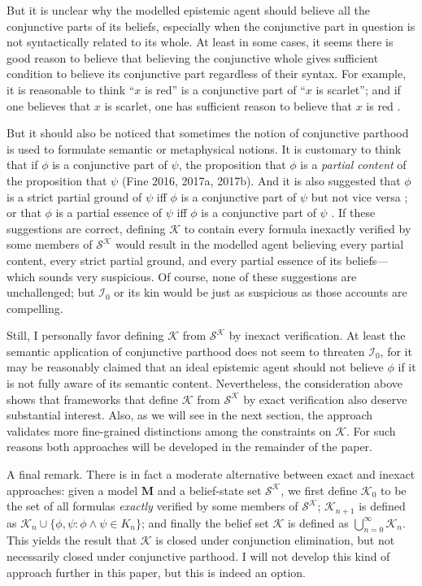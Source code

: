\documentclass[12pt]{article}
\newcommand{\K}{\mathcal{K}}
\newcommand{\SK}{\mathcal{S}^\mathcal{K}}
\begin{document}
\par
But it is unclear why the modelled epistemic agent should believe all the conjunctive parts of its beliefs, especially when the conjunctive part in question is not syntactically related to its whole. At least in some cases, it seems there is good reason to believe that believing the conjunctive whole gives sufficient condition to believe its conjunctive part regardless of their syntax. For example, it is reasonable to think ``$x$ is red'' is a conjunctive part of ``$x$ is scarlet''; and if one believes that $x$ is scarlet, one has sufficient reason to believe that $x$ is red \cite{Jago2024-JAGBIT}. 
\par
But it should also be noticed that sometimes the notion of conjunctive parthood is used to formulate semantic or metaphysical notions. It is customary to think that if $\phi$ is a conjunctive part of $\psi$, the proposition that $\phi$ is a \textit{partial content} of the proposition that $\psi$ (Fine 2016, 2017a, 2017b). And it is also suggested that $\phi$ is a strict partial ground of $\psi$ iff $\phi$ is a conjunctive part of $\psi$ but not vice versa \cite{Fine2012-FINTPL-2}; or that $\phi$ is a partial essence of $\psi$ iff $\phi$ is a conjunctive part of $\psi$ \cite{Correia2017-CORGEA}. If these suggestions are correct, defining $\K$ to contain every formula inexactly verified by some members of $\SK$ would result in the modelled agent believing every partial content, every strict partial ground, and every partial essence of its beliefs---which sounds very suspicious. Of course, none of these suggestions are unchallenged; but $\mathcal{I}_0$ or its kin would be just as suspicious as those accounts are compelling. 
\par
Still, I personally favor defining $\K$ from $\SK$ by inexact verification. At least the semantic application of conjunctive parthood does not seem to threaten $\mathcal{I}_0$, for it may be reasonably claimed that an ideal epistemic agent should not believe $\phi$ if it is not fully aware of its semantic content. Nevertheless, the consideration above shows that frameworks that define $\K$ from $\SK$ by exact verification also deserve substantial interest. Also, as we will see in the next section, the approach validates more fine-grained distinctions among the constraints on $\K$. For such reasons both approaches will be developed in the remainder of the paper.
\par
A final remark. There is in fact a moderate alternative between exact and inexact approaches: given a model $\bm{M}$ and a belief-state set $\SK$, we first define $\K_0$ to be the set of all formulas \textit{exactly} verified by some members of $\SK$; $\K_{n + 1}$ is defined as $\K_n \cup \{\phi, \psi: \phi \land \psi \in K_n\}$; and finally the belief set $\K$ is defined as $\bigcup_{n=0}^{\infty} \K_n$. This yields the result that $\K$ is closed under conjunction elimination, but not necessarily closed under conjunctive parthood. I will not develop this kind of approach further in this paper, but this is indeed an option. 
\end{document}
